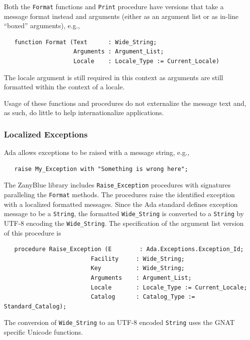 Both the \verb|Format| functions and \verb|Print| procedure have versions
that take a message format instead and arguments (either as an argument
list or as in-line ``boxed'' arguments), e.g.,
\begin{xmpl}
\begin{verbatim}
   function Format (Text      : Wide_String;
                    Arguments : Argument_List;
                    Locale    : Locale_Type := Current_Locale)
\end{verbatim}
\end{xmpl}
The locale argument is still required in this context as arguments are
still formatted within the context of a locale.

Usage of these functions and procedures do not externalize the message
text and, as such, do little to help internationalize applications.

\subsubsection{Localized Exceptions}

Ada allows exceptions to be raised with a message string, e.g.,
\begin{xmpl}
\begin{verbatim}
   raise My_Exception with "Something is wrong here";
\end{verbatim}
\end{xmpl}

The ZanyBlue library includes \verb|Raise_Exception| procedures with
signatures paralleling the \verb|Format| methods.  The procedures
raise the identified exception with a localized formatted messages.
Since the Ada standard defines exception message to be a \verb|String|,
the formatted \verb|Wide_String| is converted to a \verb|String| by
UTF-8 encoding the \verb|Wide_String|.  The specification of the
argument list version of this procedure is
\begin{xmpl}
\begin{verbatim}
   procedure Raise_Exception (E        : Ada.Exceptions.Exception_Id;
                         Facility     : Wide_String;
                         Key          : Wide_String;
                         Arguments    : Argument_List;
                         Locale       : Locale_Type := Current_Locale;
                         Catalog      : Catalog_Type := Standard_Catalog);
\end{verbatim}
\end{xmpl}
The conversion of \verb|Wide_String| to an UTF-8 encoded \verb|String| uses
the GNAT specific Unicode functions.

